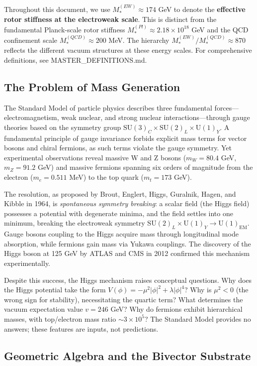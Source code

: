 \documentclass[11pt,a4paper]{article}
\newcommand{\SU}{\mathrm{SU}}
\newcommand{\U}{\mathrm{U}}
\theoremstyle{definition}
\theoremstyle{plain}
\theoremstyle{remark}
\begin{document}
Throughout this document, we use $M_*^{(EW)} \approx 174$ GeV to denote the \textbf{effective rotor stiffness at the electroweak scale}. This is distinct from the fundamental Planck-scale rotor stiffness $M_*^{(Pl)} \approx 2.18 \times 10^{18}$ GeV and the QCD confinement scale $M_*^{(QCD)} \approx 200$ MeV. The hierarchy $M_*^{(EW)}/M_*^{(QCD)} \approx 870$ reflects the different vacuum structures at these energy scales. For comprehensive definitions, see MASTER\_DEFINITIONS.md.

\subsection{The Problem of Mass Generation}

The Standard Model of particle physics describes three fundamental forces---electromagnetism, weak nuclear, and strong nuclear interactions---through gauge theories based on the symmetry group $\SU(3)_C \times \SU(2)_L \times \U(1)_Y$. A fundamental principle of gauge invariance forbids explicit mass terms for vector bosons and chiral fermions, as such terms violate the gauge symmetry. Yet experimental observations reveal massive W and Z bosons ($m_W = 80.4$ GeV, $m_Z = 91.2$ GeV) and massive fermions spanning six orders of magnitude from the electron ($m_e = 0.511$ MeV) to the top quark ($m_t = 173$ GeV).

The resolution, as proposed by Brout, Englert, Higgs, Guralnik, Hagen, and Kibble in 1964, is \emph{spontaneous symmetry breaking}: a scalar field (the Higgs field) possesses a potential with degenerate minima, and the field settles into one minimum, breaking the electroweak symmetry $\SU(2)_L \times \U(1)_Y \to \U(1)_{\text{EM}}$. Gauge bosons coupling to the Higgs acquire mass through longitudinal mode absorption, while fermions gain mass via Yukawa couplings. The discovery of the Higgs boson at 125 GeV by ATLAS and CMS in 2012 confirmed this mechanism experimentally.

Despite this success, the Higgs mechanism raises conceptual questions. Why does the Higgs potential take the form $V(\phi) = -\mu^2|\phi|^2 + \lambda|\phi|^4$? Why is $\mu^2 < 0$ (the wrong sign for stability), necessitating the quartic term? What determines the vacuum expectation value $v = 246$ GeV? Why do fermions exhibit hierarchical masses, with top/electron mass ratio $\sim 3 \times 10^5$? The Standard Model provides no answers; these features are inputs, not predictions.

\subsection{Geometric Algebra and the Bivector Substrate}
\end{document}

